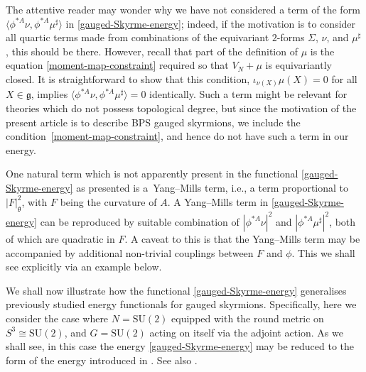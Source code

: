 \documentclass[pdftex]{sigma}
\newcommand{\g}{{\mathfrak{g}}}
\newcommand{\SU}{{\mathrm{SU}}}
\newcommand{\1}{{\mathbb{1}}}
\newcommand{\ip}[1]{\langle#1\rangle}
\numberwithin{equation}{section}
\begin{document}
The attentive reader may wonder why we have not considered a term of the form $\ip{\phi^{\ast A}\nu,\phi^{\ast A}\mu^\sharp}$ in \eqref{gauged-Skyrme-energy}; indeed, if the motivation is to consider all quartic terms made from combinations of the equivariant $2$-forms $\Sigma$, $\nu$, and $\mu^\sharp$, this should be there. However, recall that part of the definition of $\mu$ is the equation \eqref{moment-map-constraint} required so that $V_N+\mu$ is equivariantly closed. It is straightforward to show that this condition, $\iota_{\nu(X)}\mu(X)=0$ for all $X\in\g$, implies $\ip{\phi^{\ast A}\nu,\phi^{\ast A}\mu^\sharp}=0$ identically. Such a term might be relevant for theories which do not possess topological degree, but since the motivation of the present article is to describe BPS gauged skyrmions, we include the condition~\eqref{moment-map-constraint}, and hence do not have such a term in our energy.

One natural term which is not apparently present in the functional \eqref{gauged-Skyrme-energy} as presented is a~Yang--Mills term, i.e., a term proportional to $|F|_\g^2$, with $F$ being the curvature of $A$. A Yang--Mills term in \eqref{gauged-Skyrme-energy} can be reproduced by suitable combination of $|\phi^{\ast A}\nu|^2$ and $|\phi^{\ast A}\mu^\sharp|^2$, both of which are quadratic in $F$. A caveat to this is that the Yang--Mills term may be accompanied by additional non-trivial couplings between $F$ and $\phi$. This we shall see explicitly via an example below.

We shall now illustrate how the functional \eqref{gauged-Skyrme-energy} generalises previously studied energy functionals for gauged skyrmions. Specifically, here we consider the case where $N=\SU(2)$ equipped with the round metric on $S^3\cong\SU(2)$, and $G=\SU(2)$ acting on itself via the adjoint action. As we shall see, in this case the energy \eqref{gauged-Skyrme-energy} may be reduced to the form of the energy introduced in \cite{CorkHarlandWinyard2021gaugedskyrmelowbinding}. See also \cite[Section~8.2]{calliesfregierrogerszambon2016homotopy}.
\end{document}
